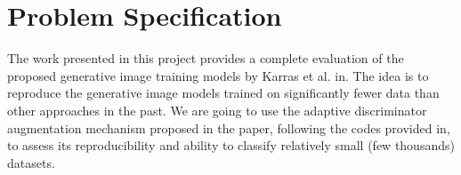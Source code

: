\documentclass{report}
\begin{document}
\section{Problem Specification}


The work presented in this project provides a complete evaluation of the proposed generative image training models by Karras et al. in\cite{karras2020training}. The idea is to reproduce the generative image models trained on significantly fewer data than other approaches in the past. We are going to use the adaptive discriminator augmentation mechanism proposed in the paper, following the codes provided in\cite{karras2020training}, to assess its reproducibility and ability to classify relatively small (few thousands) datasets.\\
\end{document}
